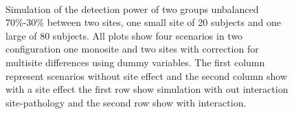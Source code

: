 \documentclass[authoryear]{elsarticle}
\begin{document}
\begin{figure}[tbp]
     \\
     \caption{
     Simulation of the detection power of two groups unbalanced 70\%-30\% between two sites, one small site of 20 subjects and one large of 80 subjects. All plots show four scenarios in two configuration one monosite and two sites with correction for multisite differences using dummy variables. The first column represent scenarios without site effect and the second column show with a site effect the first row show simulation with out interaction site-pathology and the second row show with interaction.
}
     \label{fig_full_sim_2sites_debalancing}
 \end{figure}
 
 
\end{document}
